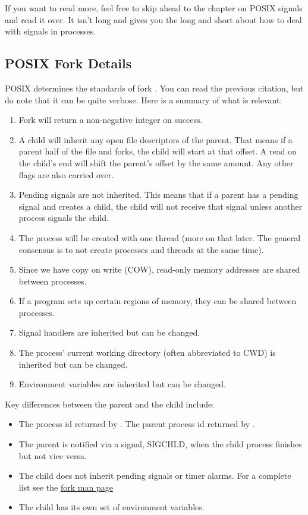 If you want to read more, feel free to skip ahead to the chapter on POSIX signals and read it over. It isn't long and gives you the long and short about how to deal with signals in processes.

\subsection{POSIX Fork Details}

POSIX determines the standards of fork \cite{fork_2018}.
You can read the previous citation, but do note that it can be quite verbose.
Here is a summary of what is relevant:

\begin{enumerate}
    \item Fork will return a non-negative integer on success.
    \item A child will inherit any open file descriptors of the parent.
          That means if a parent half of the file and forks, the child will start at that offset.
          A read on the child's end will shift the parent's offset by the same amount.
          Any other flags are also carried over.
    \item Pending signals are not inherited.
          This means that if a parent has a pending signal and creates a child, the child will not receive that signal unless another process signals the child.
    \item The process will be created with one thread (more on that later. The general consensus is to not create processes and threads at the same time).
    \item Since we have copy on write (COW), read-only memory addresses are shared between processes.
    \item If a program sets up certain regions of memory, they can be shared between processes.
    \item Signal handlers are inherited but can be changed.
    \item The process' current working directory (often abbreviated to CWD) is inherited but can be changed.
    \item Environment variables are inherited but can be changed.
\end{enumerate}

Key differences between the parent and the child include:
\begin{itemize}
    \item The process id returned by .
          The parent process id returned by .
    \item The parent is notified via a signal, SIGCHLD, when the child process finishes but not vice versa.
    \item The child does not inherit pending signals or timer alarms.
          For a complete list see the \href{http://man7.org/linux/man-pages/man2/fork.2.html}{fork man page}
    \item The child has its own set of environment variables.
\end{itemize}

